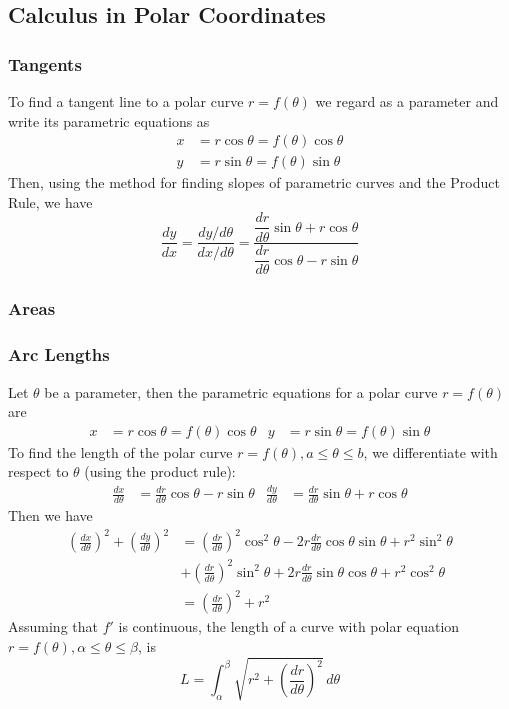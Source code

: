 \subsection{Calculus in Polar Coordinates}

\subsubsection*{Tangents}

To find a tangent line to a polar curve \(r=f(\theta)\) we regard as a
parameter and write its parametric equations as
\begin{align*}
    x &= r\cos\theta=f(\theta)\cos\theta \\
    y &= r\sin\theta=f(\theta)\sin\theta
\end{align*}
Then, using the method for finding slopes of parametric curves and the Product
 Rule, we have
\[\frac{dy}{dx}=\frac{dy/d\theta}{dx/d\theta}
=\frac{\dfrac{dr}{d\theta}\sin\theta+r\cos\theta}
{\dfrac{dr}{d\theta}\cos\theta-r\sin\theta}\]

\subsubsection*{Areas}

\subsubsection*{Arc Lengths}

Let \(\theta\) be a parameter, then the parametric equations for a polar curve
\(r=f(\theta)\) are
\begin{align*}
    x &= r\cos\theta=f(\theta)\cos\theta & y &= r\sin\theta=f(\theta)\sin\theta
\end{align*}
To find the length of the polar curve \(r=f(\theta),a\leq\theta\leq b\),
we differentiate with respect to \(\theta\) (using the product rule):
\begin{align*}
    \frac{dx}{d\theta} &= \frac{dr}{d\theta}\cos\theta-r\sin\theta
    & \frac{dy}{d\theta} &= \frac{dr}{d\theta}\sin\theta+r\cos\theta
\end{align*}
Then we have
\begin{align*}
    \left(\frac{dx}{d\theta}\right)^2+\left(\frac{dy}{d\theta}\right)^2
    &= \left(\frac{dr}{d\theta}\right)^2\cos^2\theta
    -2r\frac{dr}{d\theta}\cos\theta\sin\theta+r^2\sin^2\theta \\
    &+ \left(\frac{dr}{d\theta}\right)^2\sin^2\theta
    +2r\frac{dr}{d\theta}\sin\theta\cos\theta+r^2\cos^2\theta \\
    &= \left(\frac{dr}{d\theta}\right)^2+r^2
\end{align*}
Assuming that \(f'\) is continuous, the length of a curve with polar equation
\(r=f(\theta),\alpha\leq\theta\leq\beta\), is
\[L
=\int_{\alpha}^{\beta}\sqrt{r^2+\left(\frac{dr}{d\theta}\right)^2}\,d\theta\]

